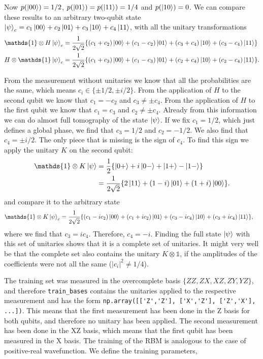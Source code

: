 \documentclass[submission, Phys]{SciPost}
\begin{document}
Now $p(\ket{00}) = 1/2$, $p(\ket{01}) = p(\ket{11}) = 1/4$ and $p(\ket{10}) = 0$. 
We can compare these results to an arbitrary two-qubit state $\ket{\psi}_c =  c_1 \ket{00} +c_2 \ket{01} + c_3 \ket{10} +c_4 \ket{11}$, 
with all the unitary transformations
\begin{align}
 \mathds{1}  \otimes H  \ket{\psi}_c&= \frac{1}{2\sqrt{2}} \{ (c_1+c_2) \ket{00} + (c_1 -c_2)\ket{01} + (c_3 + c_4)\ket{10} + (c_3-c_4)\ket{11} \}\\
 H  \otimes \mathds{1} \ket{\psi}_c&= \frac{1}{2\sqrt{2}} \{ (c_1+c_3) \ket{00} + (c_1 -c_3)\ket{01} + (c_2 + c_4)\ket{10} + (c_2-c_4)\ket{11} \}.
\end{align}

From the measurement without unitaries we know that all the probabilities are the same, 
which means $c_i \in \{ \pm 1/2, \pm i/2 \}$.
From the application of $H$ to the second qubit we know that $c_1 = -c_2$ and $c_3 \neq \pm c_4$. 
From the application of $H$ to the first qubit we know that $c_1 = c_3$ and $c_2 \neq \pm c_4$. 
Already from this information we can do almost full tomography of the state $\ket{\psi}$. 
If we fix $c_1 = 1/2$, which just defines a global phase, we find that $c_3 = 1/2$ and $c_2 = -1/2$. 
We also find that $c_4 = \pm i/2$. 
The only piece that is missing is the sign of $c_4$. To find this sign we apply the unitary $K$ on the second qubit:
\begin{align}
\mathds{1} \otimes K \ket{\psi} &= \frac{1}{2} \{ \ket{0+} +i \ket{0-} + \ket{1+} -  \ket{1-} \} \\
&=  \frac{1}{2 \sqrt{2}} \{ 2 \ket{11} + (1-i)\ket{01} + (1+i)\ket{00} \}. 
\end{align}
%
and compare it to the arbitrary state 
%
\begin{align}
 \mathds{1}  \otimes K  \ket{\psi}_c&= \frac{1}{2\sqrt{2}} \{ (c_1-ic_2) \ket{00} + (c_1 +ic_2)\ket{01} + (c_3 -ic_4)\ket{10} + (c_3+ic_4)\ket{11} \},
\end{align}
%
where we find that $c_3 = ic_4$. Therefore, $c_4 = -i$. 
Finding the full state $\ket{\psi}$ with this set of unitaries shows that it is a complete set of unitaries. 
It might very well be that the complete set also contains the unitary $K \otimes \mathds{1}$, 
if the amplitudes of the coefficients were not all the same ($|c_i|^2 \neq 1/4$).

The training set was measured in the overcomplete basis $\{ZZ, ZX, XZ, ZY, YZ \}$, and therefore \verb|train_bases| contains the unitaries applied to the respective measurement and has the form  \verb|np.array([['Z','Z'], ['X','Z'], ['Z','X'], ...])|. 
This means that the first measurement has been done in the Z basis for both qubits, 
and therefore no unitary has been applied. The second measurement has been done in the XZ basis, 
which means that the first qubit has been measured in the X basis. The training of the RBM is analogous to the case of positive-real wavefunction. 
We define the training parameters,
\end{document}
